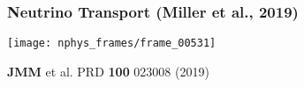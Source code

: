 \documentclass[]{beamer}
\begin{document}

\begin{frame}
  \frametitle{Neutrino Transport (Miller et al., 2019)}
  \begin{center}
    \texttt{[image: nphys\_frames/frame\_00531]}
  \end{center}
  \begin{tiny}
    \textbf{JMM} et al. PRD \textbf{100} 023008 (2019)
  \end{tiny}
\end{frame}
\end{document}
